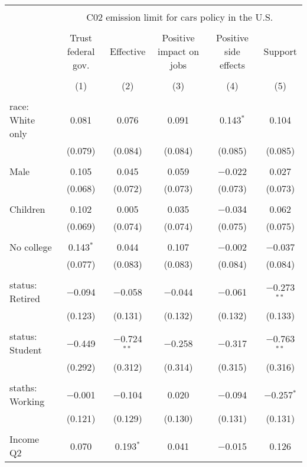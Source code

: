 
\begin{tabular}{@{\extracolsep{5pt}}lccccc} 
\\[-1.8ex]\hline 
\hline \\[-1.8ex] 
 & \multicolumn{5}{c}{C02 emission limit for cars policy in the U.S.} \\ 
\cline{2-6} 
\\[-1.8ex] & Trust federal gov. & Effective & Positive impact on jobs & Positive side effects & Support \\ 
\\[-1.8ex] & (1) & (2) & (3) & (4) & (5)\\ 
\hline \\[-1.8ex] 
 race: White only & 0.081 & 0.076 & 0.091 & 0.143$^{*}$ & 0.104 \\ 
  & (0.079) & (0.084) & (0.084) & (0.085) & (0.085) \\ 
  & & & & & \\ 
 Male & 0.105 & 0.045 & 0.059 & $-$0.022 & 0.027 \\ 
  & (0.068) & (0.072) & (0.073) & (0.073) & (0.073) \\ 
  & & & & & \\ 
 Children & 0.102 & 0.005 & 0.035 & $-$0.034 & 0.062 \\ 
  & (0.069) & (0.074) & (0.074) & (0.075) & (0.075) \\ 
  & & & & & \\ 
 No college & 0.143$^{*}$ & 0.044 & 0.107 & $-$0.002 & $-$0.037 \\ 
  & (0.077) & (0.083) & (0.083) & (0.084) & (0.084) \\ 
  & & & & & \\ 
 status: Retired & $-$0.094 & $-$0.058 & $-$0.044 & $-$0.061 & $-$0.273$^{**}$ \\ 
  & (0.123) & (0.131) & (0.132) & (0.132) & (0.133) \\ 
  & & & & & \\ 
 status: Student & $-$0.449 & $-$0.724$^{**}$ & $-$0.258 & $-$0.317 & $-$0.763$^{**}$ \\ 
  & (0.292) & (0.312) & (0.314) & (0.315) & (0.316) \\ 
  & & & & & \\ 
 staths: Working & $-$0.001 & $-$0.104 & 0.020 & $-$0.094 & $-$0.257$^{*}$ \\ 
  & (0.121) & (0.129) & (0.130) & (0.131) & (0.131) \\ 
  & & & & & \\ 
 Income Q2 & 0.070 & 0.193$^{*}$ & 0.041 & $-$0.015 & 0.126 \\ 

\end{tabular}
